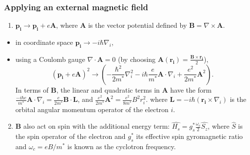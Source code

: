 \documentclass[xcolor=pdftex,hyperref={pdfpagelabels=false},table]{beamer}
\begin{document}
\begin{frame}
\frametitle{Applying an external magnetic field}
\begin{scriptsize}
\begin{enumerate}
 \item 
	$\mathbf{p_i} \longrightarrow \mathbf{p_i}+e\mathbf{A}$, %
where $\mathbf{A}$ is the vector potential defined by $\mathbf{B}=\nabla \times \mathbf{A}$.
\end{enumerate}
\begin{itemize}
 \item
	in coordinate space $\mathbf{p_i} \rightarrow -i \hbar \nabla_i$,
\item
	using a Coulomb gauge $\nabla \cdot \mathbf{A} = 0$ (by choosing $\mathbf{A}(\mathbf{r_i}) = \frac{\mathbf{B} \times \mathbf{r_i}}{2}$),
\begin{equation}
(\mathbf{p_i}+e\mathbf{A})^2 \rightarrow  \left( -\frac{ \hbar^2}{2m^*} \nabla_i^2- i \hbar \frac{e}{m^*} \mathbf{A}\cdot \nabla_i + \frac{e^2}{2m^*}\mathbf{A}^2  \right).
\end{equation}
In terms of  $\mathbf{B}$, the linear and quadratic terms in  $\mathbf{A}$ have the form
$\frac{-i \hbar e}{m^*} \mathbf{A} \cdot \nabla_i = \frac{ e}{2m^*} \mathbf{B} \cdot \mathbf{L}$, and $\frac{e^2}{2m^*} \mathbf{A}^2 = \frac{e^2}{8m^*} B^2 r_i^2$.
where $\mathbf{L}=-i \hbar (\mathbf{r_i} \times \nabla_i)$ is the orbital angular momentum operator of the electron $i$.
\end{itemize}
\begin{enumerate}
\setcounter{enumi}{1}
\item 
	$\mathbf{B}$ also act on spin with the additional energy term: $\hat{H_s}= g^*_s \frac{\omega_c}{2} \hat{S_z}$, where $\hat{S}$ is the spin operator of the electron and $g^*_s$ its effective spin gyromagnetic ratio and $\omega_c=e B/m^*$ is known as the cyclotron frequency.
\end{enumerate}
\end{scriptsize}
\end{frame}
\end{document}
